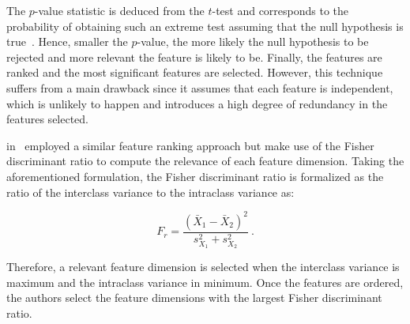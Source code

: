 The $p$-value statistic is deduced from the $t$-test and corresponds to the probability of obtaining such an extreme test assuming that the null hypothesis is true~\cite{Goodman1999}.
Hence, smaller the $p$-value, the more likely the null hypothesis to be rejected and more relevant the feature is likely to be.
Finally, the features are ranked and the most significant features are selected.
However, this technique suffers from a main drawback since it assumes that each feature is independent, which is unlikely to happen and introduces a high degree of redundancy in the features selected.

\citeauthor{Vos2012} in~\cite{Vos2012} employed a similar feature ranking approach but make use of the Fisher discriminant ratio to compute the relevance of each feature dimension.
Taking the aforementioned formulation, the Fisher discriminant ratio is formalized as the ratio of the interclass variance to the intraclass variance as:

\begin{equation}
F_r = \frac{(\bar{X}_1 - \bar{X}_2)^2}{s^{2}_{X_1}+s^{2}_{X_2}} \ .
\label{eq:fisherratio}
\end{equation}

Therefore, a relevant feature dimension is selected when the interclass variance is maximum and the intraclass variance in minimum.
Once the features are ordered, the authors select the feature dimensions with the largest Fisher discriminant ratio.

